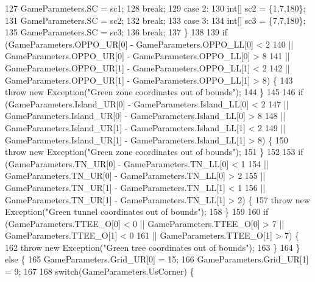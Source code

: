 \begin{DoxyCode}
127             GameParameters.SC = sc1;
128             \textcolor{keywordflow}{break};
129           \textcolor{keywordflow}{case} 2:
130             \textcolor{keywordtype}{int}[] sc2 = \{1,7,180\};
131             GameParameters.SC = sc2;
132             \textcolor{keywordflow}{break};
133           \textcolor{keywordflow}{case} 3:
134             \textcolor{keywordtype}{int}[] sc3 = \{7,7,180\};
135             GameParameters.SC = sc3;
136             \textcolor{keywordflow}{break};
137         \}
138 
139         \textcolor{keywordflow}{if} (GameParameters.OPPO\_UR[0] - GameParameters.OPPO\_LL[0] < 2
140             || GameParameters.OPPO\_UR[0] - GameParameters.OPPO\_LL[0] > 8
141             || GameParameters.OPPO\_UR[1] - GameParameters.OPPO\_LL[1] < 2
142             || GameParameters.OPPO\_UR[1] - GameParameters.OPPO\_LL[1] > 8) \{
143           \textcolor{keywordflow}{throw} \textcolor{keyword}{new} Exception(\textcolor{stringliteral}{"Green zone coordinates out of bounds"});
144         \}
145 
146         \textcolor{keywordflow}{if} (GameParameters.Island\_UR[0] - GameParameters.Island\_LL[0] < 2
147             || GameParameters.Island\_UR[0] - GameParameters.Island\_LL[0] > 8
148             || GameParameters.Island\_UR[1] - GameParameters.Island\_LL[1] < 2
149             || GameParameters.Island\_UR[1] - GameParameters.Island\_LL[1] > 8) \{
150           \textcolor{keywordflow}{throw} \textcolor{keyword}{new} Exception(\textcolor{stringliteral}{"Green zone coordinates out of bounds"});
151         \}
152 
153         \textcolor{keywordflow}{if} (GameParameters.TN\_UR[0] - GameParameters.TN\_LL[0] < 1
154             || GameParameters.TN\_UR[0] - GameParameters.TN\_LL[0] > 2
155             || GameParameters.TN\_UR[1] - GameParameters.TN\_LL[1] < 1
156             || GameParameters.TN\_UR[1] - GameParameters.TN\_LL[1] > 2) \{
157           \textcolor{keywordflow}{throw} \textcolor{keyword}{new} Exception(\textcolor{stringliteral}{"Green tunnel coordinates out of bounds"});
158         \}
159 
160         \textcolor{keywordflow}{if} (GameParameters.TTEE\_O[0] < 0 || GameParameters.TTEE\_O[0] > 7 || GameParameters.TTEE\_O[1] < 0
161             || GameParameters.TTEE\_O[1] > 7) \{
162           \textcolor{keywordflow}{throw} \textcolor{keyword}{new} Exception(\textcolor{stringliteral}{"Green tree coordinates out of bounds"});
163         \}
164       \} \textcolor{keywordflow}{else} \{
165         GameParameters.Grid\_UR[0] = 15;
166         GameParameters.Grid\_UR[1] = 9;
167  
168         \textcolor{keywordflow}{switch}(GameParameters.UsCorner) \{

\end{DoxyCode}
